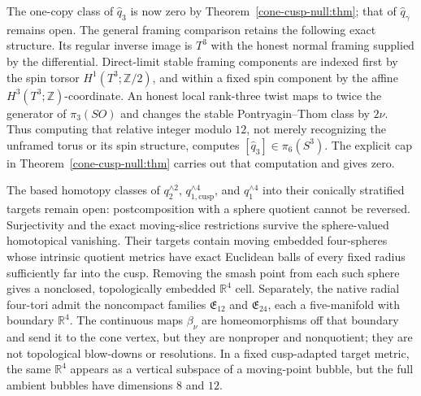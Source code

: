 \documentclass[11pt,letterpaper]{article}
\numberwithin{equation}{section}
\theoremstyle{definition}
\theoremstyle{remark}
\newcommand{\R}{\mathbb R}
\newcommand{\Z}{\mathbb Z}
\begin{document}
The one-copy class of \(\widehat q_3\) is now zero by
Theorem~\ref{cone-cusp-null:thm}; that of \(\widehat q_\gamma\) remains open.
The general framing comparison retains the following exact structure.  Its regular inverse image is \(T^3\)
with the honest normal framing supplied by the differential.  Direct-limit
stable framing components are indexed first by the spin torsor
\(H^1(T^3;\Z/2)\), and within a fixed spin component by the affine
\(H^3(T^3;\Z)\)-coordinate.  An honest local rank-three twist maps to twice
the generator of \(\pi_3(SO)\) and changes the stable Pontryagin--Thom
class by \(2\nu\).  Thus computing that relative integer modulo \(12\),
not merely recognizing the unframed torus or its spin structure, computes
\([\widehat q_3]\in\pi_6(S^3)\). The explicit cap in
Theorem~\ref{cone-cusp-null:thm} carries out that computation and gives zero.

The based homotopy classes of
\(q_2^{\wedge2}\), \(q_{1,\mathrm{cusp}}^{\wedge4}\), and
\(q_1^{\wedge4}\) into their conically stratified targets remain open:
postcomposition with a sphere quotient cannot be reversed.  Surjectivity
and the exact moving-slice restrictions survive the sphere-valued
homotopical vanishing.
Their targets contain moving embedded four-spheres whose intrinsic
quotient metrics have exact Euclidean balls of every fixed radius
sufficiently far into the cusp.  Removing the smash point from each such
sphere gives a nonclosed, topologically embedded \(\R^4\) cell.
Separately, the native radial four-tori admit the noncompact families
\(\mathfrak E_{12}\) and \(\mathfrak E_{24}\), each a five-manifold with
boundary \(\R^4\).  The continuous maps \(\beta_\nu\) are homeomorphisms
off that boundary and send it to the cone vertex, but they are nonproper
and nonquotient; they are not topological blow-downs or resolutions.  In a
fixed cusp-adapted target metric, the same \(\R^4\)
appears as a vertical subspace of a moving-point bubble, but the full
ambient bubbles have dimensions \(8\) and \(12\).
\end{document}
